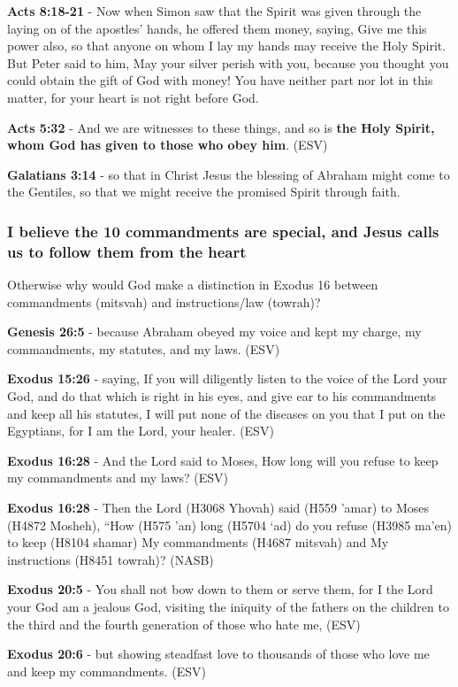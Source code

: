 \documentclass[11pt]{article}
\begin{document}
\textbf{Acts 8:18-21} - Now when Simon saw that the Spirit was given through the laying on of the apostles' hands, he offered them money, saying, Give me this power also, so that anyone on whom I lay my hands may receive the Holy Spirit.  But Peter said to him, May your silver perish with you, because you thought you could obtain the gift of God with money!  You have neither part nor lot in this matter, for your heart is not right before God.

\textbf{Acts 5:32} - And we are witnesses to these things, and so is \textbf{the Holy Spirit, whom God has given to those who obey him}. (ESV)

\textbf{Galatians 3:14} - so that in Christ Jesus the blessing of Abraham might come to the Gentiles, so that we might receive the promised Spirit through faith.

\subsubsection{I believe the 10 commandments are special, and Jesus calls us to follow them from the heart}
\label{sec:orge8ea377}
Otherwise why would God make a distinction in Exodus 16 between commandments (mitsvah) and instructions/law (towrah)?

\textbf{Genesis 26:5} - because Abraham obeyed my voice and kept my charge, my commandments, my statutes, and my laws. (ESV)

\textbf{Exodus 15:26} - saying, If you will diligently listen to the voice of the Lord your God, and do that which is right in his eyes, and give ear to his commandments and keep all his statutes, I will put none of the diseases on you that I put on the Egyptians, for I am the Lord, your healer. (ESV)

\textbf{Exodus 16:28} - And the Lord said to Moses, How long will you refuse to keep my commandments and my laws? (ESV)

\textbf{Exodus 16:28} - Then the Lord (H3068 Yhovah) said (H559 'amar) to Moses (H4872 Mosheh), “How (H575 'an) long (H5704 `ad) do you refuse (H3985 ma'en) to keep (H8104 shamar) My commandments (H4687 mitsvah) and My instructions (H8451 towrah)? (NASB)

\textbf{Exodus 20:5} - You shall not bow down to them or serve them, for I the Lord your God am a jealous God, visiting the iniquity of the fathers on the children to the third and the fourth generation of those who hate me, (ESV)

\textbf{Exodus 20:6} - but showing steadfast love to thousands of those who love me and keep my commandments. (ESV)
\end{document}
